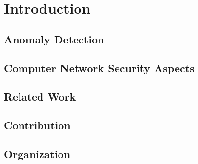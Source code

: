 

\chapter{Introduction}

\section{Anomaly Detection}

\section{Computer Network Security Aspects}

\section{Related Work}
\cite{jiangtime}
\cite{he2004spectral}
\cite{chen2007tcp}
\cite{zalewski2005silence}
\cite{chandola2009anomaly}

\section{Contribution}

\section{Organization}
